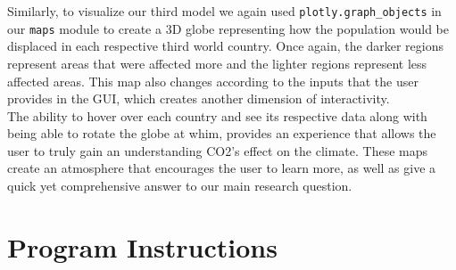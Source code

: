 \documentclass[fontsize=11pt]{article}
\begin{document}
Similarly, to visualize our third model we again used \texttt{plotly.graph\_objects} in our \texttt{maps} module to create a 3D globe representing how the population would be displaced in each respective third world country. Once again, the darker regions represent areas that were affected more and the lighter regions represent less affected areas. This map also changes according to the inputs that the user provides in the GUI, which creates another dimension of interactivity. \\

The ability to hover over each country and see its respective data along with being able to rotate the globe at whim, provides an experience that allows the user to truly gain an understanding CO2's effect on the climate. These maps create an atmosphere that encourages the user to learn more, as well as give a quick yet comprehensive answer to our main research question.

\section*{Program Instructions}
\end{document}
